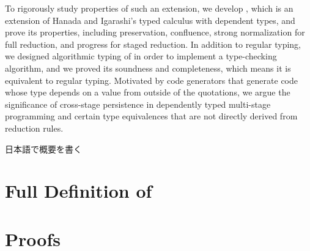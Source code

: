\documentclass[master,english]{kuisthesis}
\begin{document}
\begin{eabstract}

To rigorously study properties of such an extension, we develop \LMD, which is
    an extension of Hanada and Igarashi's typed calculus \LTP with dependent
    types, and prove its properties, including preservation, confluence, strong
    normalization for full reduction, and progress for staged reduction. In
    addition to regular typing, we designed algorithmic typing of \LMD in order
    to implement a type-checking algorithm, and we proved its soundness and
    completeness, which means it is equivalent to regular typing. Motivated by
    code generators that generate code whose type depends on a value from
    outside of the quotations, we argue the significance of cross-stage
    persistence in dependently typed multi-stage programming and certain type
    equivalences that are not directly derived from reduction rules. 

\end{eabstract}

\begin{jabstract}				%
日本語で概要を書く
\end{jabstract}

\tableofcontents				%


















\iffullversion
\appendix

\newtheorem{dfn}{Definition}
\newtheorem{ex}{Example}
\newtheorem{cm}{Comment}
\newcommand{\figheader}[2]{
  \begin{flushleft}
    #2 {\bf \normalsize #1}
\end{flushleft}}

\newpage
\section{Full Definition of \LMD}


\section{Proofs}


\fi
\end{document}
